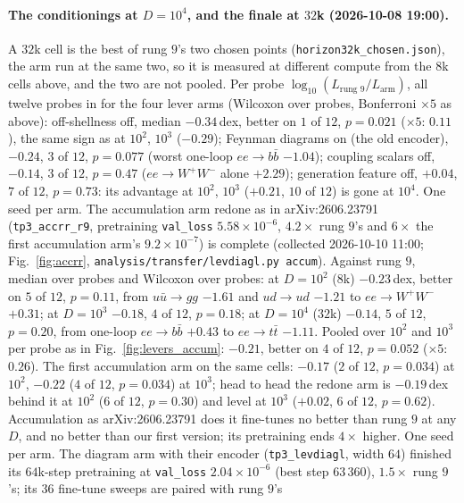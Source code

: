 \documentclass[11pt]{article}
\newcommand{\code}[1]{\texttt{#1}}
\begin{document}
\paragraph{The conditionings at $D=10^4$, and the finale at $32$k (2026-10-08 19:00).} A $32$k cell is the best
of rung $9$'s two chosen points (\code{horizon32k\_chosen.json}), the arm run at the same two, so it is measured at
different compute from the $8$k cells above, and the two are not pooled. Per probe $\log_{10}(L_\text{rung 9}/L_\text{arm})$,
all twelve probes in for the four lever arms (Wilcoxon over probes, Bonferroni $\times5$ as above): off-shellness off,
median $-0.34$\,dex, better on $1$ of $12$, $p=0.021$ ($\times5$: $0.11$), the same sign as at $10^2$, $10^3$ ($-0.29$);
Feynman diagrams on (the old encoder), $-0.24$, $3$ of $12$, $p=0.077$ (worst one-loop $ee\to b\bar b$ $-1.04$);
coupling scalars off, $-0.14$, $3$ of $12$, $p=0.47$ ($ee\to W^+W^-$ alone $+2.29$); generation feature off, $+0.04$,
$7$ of $12$, $p=0.73$: its advantage at $10^2$, $10^3$ ($+0.21$, $10$ of $12$) is gone at $10^4$. One seed per arm.
The accumulation arm redone as in arXiv:2606.23791 (\code{tp3\_accrr\_r9}, pretraining \code{val\_loss}
$5.58\times10^{-6}$, $4.2\times$ rung $9$'s and $6\times$ the first accumulation arm's $9.2\times10^{-7}$) is complete
(collected 2026-10-10 11:00; Fig.~\ref{fig:accrr}, \code{analysis/transfer/levdiagl.py accum}). Against rung $9$, median over
probes and Wilcoxon over probes: at $D=10^2$ ($8$k) $-0.23$\,dex, better on $5$ of $12$, $p=0.11$, from $u\bar u\to gg$ $-1.61$
and $ud\to ud$ $-1.21$ to $ee\to W^+W^-$ $+0.31$; at $D=10^3$ $-0.18$, $4$ of $12$, $p=0.18$; at $D=10^4$ ($32$k) $-0.14$,
$5$ of $12$, $p=0.20$, from one-loop $ee\to b\bar b$ $+0.43$ to $ee\to t\bar t$ $-1.11$. Pooled over $10^2$ and $10^3$ per probe as
in Fig.~\ref{fig:levers_accum}: $-0.21$, better on $4$ of $12$, $p=0.052$ ($\times5$: $0.26$). The first accumulation arm on
the same cells: $-0.17$ ($2$ of $12$, $p=0.034$) at $10^2$, $-0.22$ ($4$ of $12$, $p=0.034$) at $10^3$; head to head the redone arm is
$-0.19$\,dex behind it at $10^2$ ($6$ of $12$, $p=0.30$) and level at $10^3$ ($+0.02$, $6$ of $12$, $p=0.62$). Accumulation as
arXiv:2606.23791 does it fine-tunes no better than rung $9$ at any $D$, and no better than our first version; its pretraining
ends $4\times$ higher. One seed per arm. The diagram arm with their encoder (\code{tp3\_levdiagl}, width $64$) finished its $64$k-step pretraining at
\code{val\_loss} $2.04\times10^{-6}$ (best step $63\,360$), $1.5\times$ rung $9$'s; its $36$ fine-tune sweeps are paired with rung $9$'s
\end{document}
